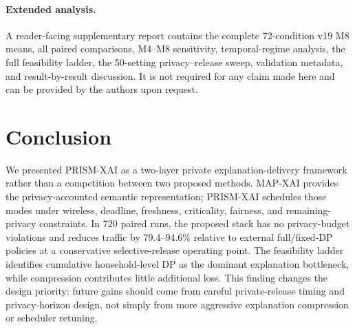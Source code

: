 \documentclass[conference]{IEEEtran}
\newcommand{\method}{PRISM-XAI}
\newcommand{\mapxai}{MAP-XAI}
\begin{document}
\paragraph{Extended analysis.}
A reader-facing supplementary report contains the complete 72-condition
v19 M8 means, all paired comparisons, M4--M8 sensitivity, temporal-regime
analysis, the full feasibility ladder, the 50-setting privacy--release
sweep, validation metadata, and result-by-result discussion. It is not
required for any claim made here and can be provided by the authors upon
request.

\section{Conclusion}

We presented \method{} as a two-layer private explanation-delivery
framework rather than a competition between two proposed methods.
\mapxai{} provides the privacy-accounted semantic representation;
\method{} schedules those modes under wireless, deadline, freshness,
criticality, fairness, and remaining-privacy constraints. In 720 paired
runs, the proposed stack has no privacy-budget violations and reduces
traffic by 79.4--94.6\% relative to external full/fixed-DP policies at a
conservative selective-release operating point. The feasibility ladder
identifies cumulative household-level DP as the dominant explanation
bottleneck, while compression contributes little additional loss. This
finding changes the design priority: future gains should come from
careful private-release timing and privacy-horizon design, not simply
from more aggressive explanation compression or scheduler retuning.
\end{document}
